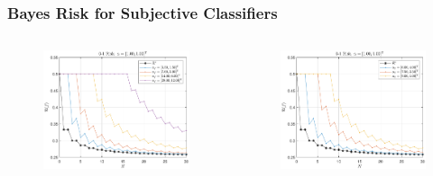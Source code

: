 \documentclass{beamer}
\begin{document}
\begin{frame}
\frametitle{Bayes Risk for Subjective Classifiers}

\begin{columns}[c]

\begin{column}{.5\linewidth}

\begin{figure}
\centering
\includegraphics[width=1\linewidth]{Risk_01_Dir_N_leg_f_a0.pdf}
\label{fig:Risk_01_Dir_N_leg_f_a0}
\end{figure}

\end{column}

\begin{column}{.5\linewidth}

\begin{figure}
\centering
\includegraphics[width=1\linewidth]{Risk_01_Dir_N_leg_f_mu.pdf}
\label{fig:Risk_01_Dir_N_leg_f_mu}
\end{figure}

\end{column}

\end{columns}

\end{frame}
\end{document}
